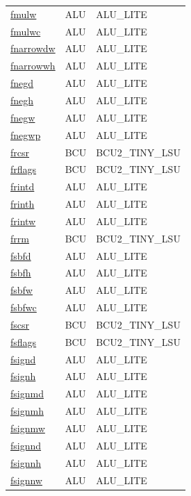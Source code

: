 \begin{small}
\begin{longtable}[l]{l l l}
\hyperlink{lvx.fmulw}{fmulw} & ALU & ALU\_LITE \\ 
\hyperlink{lvx.fmulwc}{fmulwc} & ALU & ALU\_LITE \\ 
\hyperlink{lvx.fnarrowdw}{fnarrowdw} & ALU & ALU\_LITE \\ 
\hyperlink{lvx.fnarrowwh}{fnarrowwh} & ALU & ALU\_LITE \\ 
\hyperlink{lvx.fnegd}{fnegd} & ALU & ALU\_LITE \\ 
\hyperlink{lvx.fnegh}{fnegh} & ALU & ALU\_LITE \\ 
\hyperlink{lvx.fnegw}{fnegw} & ALU & ALU\_LITE \\ 
\hyperlink{lvx.fnegwp}{fnegwp} & ALU & ALU\_LITE \\ 
\hyperlink{lvx.frcsr}{frcsr} & BCU & BCU2\_TINY\_LSU \\ 
\hyperlink{lvx.frflags}{frflags} & BCU & BCU2\_TINY\_LSU \\ 
\hyperlink{lvx.frintd}{frintd} & ALU & ALU\_LITE \\ 
\hyperlink{lvx.frinth}{frinth} & ALU & ALU\_LITE \\ 
\hyperlink{lvx.frintw}{frintw} & ALU & ALU\_LITE \\ 
\hyperlink{lvx.frrm}{frrm} & BCU & BCU2\_TINY\_LSU \\ 
\hyperlink{lvx.fsbfd}{fsbfd} & ALU & ALU\_LITE \\ 
\hyperlink{lvx.fsbfh}{fsbfh} & ALU & ALU\_LITE \\ 
\hyperlink{lvx.fsbfw}{fsbfw} & ALU & ALU\_LITE \\ 
\hyperlink{lvx.fsbfwc}{fsbfwc} & ALU & ALU\_LITE \\ 
\hyperlink{lvx.fscsr}{fscsr} & BCU & BCU2\_TINY\_LSU \\ 
\hyperlink{lvx.fsflags}{fsflags} & BCU & BCU2\_TINY\_LSU \\ 
\hyperlink{lvx.fsignd}{fsignd} & ALU & ALU\_LITE \\ 
\hyperlink{lvx.fsignh}{fsignh} & ALU & ALU\_LITE \\ 
\hyperlink{lvx.fsignmd}{fsignmd} & ALU & ALU\_LITE \\ 
\hyperlink{lvx.fsignmh}{fsignmh} & ALU & ALU\_LITE \\ 
\hyperlink{lvx.fsignmw}{fsignmw} & ALU & ALU\_LITE \\ 
\hyperlink{lvx.fsignnd}{fsignnd} & ALU & ALU\_LITE \\ 
\hyperlink{lvx.fsignnh}{fsignnh} & ALU & ALU\_LITE \\ 
\hyperlink{lvx.fsignnw}{fsignnw} & ALU & ALU\_LITE \\ 

\end{longtable}
\end{small}
